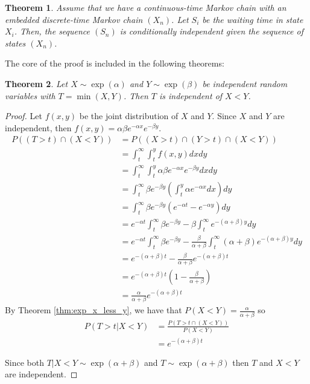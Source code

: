 \documentclass{article}
\theoremstyle{plain}
\newtheorem{theorem}{Theorem}[section]
\theoremstyle{definition}
\theoremstyle{remark}
\numberwithin{equation}{section}
\begin{document}
\begin{theorem}\label{thm:x_N_indep}
Assume that we have a continuous-time Markov chain with an embedded discrete-time Markov chain $(X_n)$.
Let $S_i$ be the waiting time in state $X_i$.
Then, the sequence $(S_n)$ is conditionally independent given the sequence of states $(X_n)$.
\end{theorem}

The core of the proof is included in the following theorems:

\begin{theorem}
Let $X \sim \exp(\alpha)$ and $Y \sim \exp(\beta)$ be independent random variables with $T = \min(X,Y)$.
Then $T$ is independent of $X < Y$.
\end{theorem}

\begin{proof}
Let $f(x,y)$ be the joint distribution of $X$ and $Y$.
Since $X$ and $Y$ are independent, then $f(x,y) = \alpha \beta e^{-\alpha x} e^{-\beta y}$.
\begin{align*}
    P((T > t) \cap (X < Y)) &= P((X > t) \cap (Y > t) \cap (X < Y))\\
    &= \int_t^\infty \int_t^y f(x,y) dx dy\\
    &= \int_t^\infty \int_t^y \alpha \beta e^{-\alpha x} e^{-\beta y} dx dy\\
    &= \int_t^\infty \beta e^{-\beta y} \left(\int_t^y \alpha e^{-\alpha x} dx \right)  dy\\
    &= \int_t^\infty \beta e^{-\beta y} \left( e^{-\alpha t} - e^{-\alpha y} \right) dy\\
    &= e^{-\alpha t} \int_t^\infty \beta e^{-\beta y} - \beta \int_t^\infty e^{-(\alpha + \beta) y} dy\\
    &= e^{-\alpha t} \int_t^\infty \beta e^{-\beta y} - \frac{\beta}{\alpha + \beta} \int_t^\infty (\alpha + \beta) e^{-(\alpha + \beta) y} dy\\
    &= e^{-(\alpha + \beta) t} - \frac{\beta}{\alpha + \beta} e^{-(\alpha + \beta) t}\\
    &= e^{-(\alpha + \beta) t} \left(1 - \frac{\beta}{\alpha + \beta} \right)\\
    &= \frac{\alpha}{\alpha + \beta} e^{-(\alpha + \beta) t}
\end{align*}
By Theorem \ref{thm:exp_x_less_y}, we have that $P(X < Y) = \frac{\alpha}{\alpha + \beta}$ so
\begin{align*}
    P(T > t | X < Y) &= \frac{P(T > t \cap (X < Y))}{P(X < Y)}\\
    &= e^{-(\alpha + \beta) t}
\end{align*}

Since both $T | X < Y \sim \exp(\alpha + \beta)$ and $T \sim \exp(\alpha + \beta)$ then $T$ and $X < Y$ are independent.
\end{proof}
\end{document}
